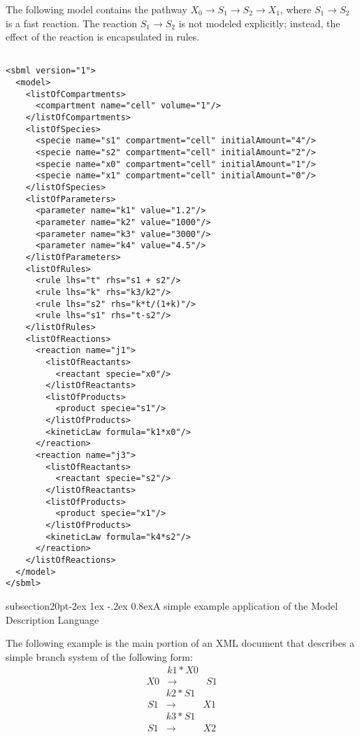 \documentclass[10pt]{article}
\makeatletter
\renewcommand{\subsection}{\@startsection%
  {subsection}{2}{0pt}{-2ex \@plus 1ex \@minus -.2ex}%
  {0.8ex}{\slshape\large\bfseries}}
\newcommand{\tightspacing}{\renewcommand{\baselinestretch}{0.85}}
\newcommand{\regularspacing}{\renewcommand{\baselinestretch}{1.0}}
\makeatother
\begin{document}
The following model contains the pathway $X_0 \rightarrow S_1
\rightarrow S_2 \rightarrow X_1$, where $S_1 \rightarrow S_2$ is
a fast reaction. The reaction $S_1 \rightarrow S_2$ is not
modeled explicitly; instead, the effect of the reaction is
encapsulated in rules.

\begin{small}
\tightspacing
\begin{verbatim}

<sbml version="1">
  <model>
    <listOfCompartments>
      <compartment name="cell" volume="1"/>
    </listOfCompartments>
    <listOfSpecies>
      <specie name="s1" compartment="cell" initialAmount="4"/>
      <specie name="s2" compartment="cell" initialAmount="2"/>
      <specie name="x0" compartment="cell" initialAmount="1"/>
      <specie name="x1" compartment="cell" initialAmount="0"/>
    </listOfSpecies>
    <listOfParameters>
      <parameter name="k1" value="1.2"/>
      <parameter name="k2" value="1000"/>
      <parameter name="k3" value="3000"/>
      <parameter name="k4" value="4.5"/>
    </listOfParameters>
    <listOfRules>
      <rule lhs="t" rhs="s1 + s2"/>
      <rule lhs="k" rhs="k3/k2"/>
      <rule lhs="s2" rhs="k*t/(1+k)"/>
      <rule lhs="s1" rhs="t-s2"/>
    </listOfRules>
    <listOfReactions>
      <reaction name="j1">
        <listOfReactants>
          <reactant specie="x0"/>
        </listOfReactants>
        <listOfProducts>
          <product specie="s1"/>
        </listOfProducts>
        <kineticLaw formula="k1*x0"/>
      </reaction>
      <reaction name="j3">
        <listOfReactants>
          <reactant specie="s2"/>
        </listOfReactants>
        <listOfProducts>
          <product specie="x1"/>
        </listOfProducts>
        <kineticLaw formula="k4*s2"/>
      </reaction>
    </listOfReactions>
  </model>
</sbml>

\end{verbatim}
  \regularspacing
\end{small}


\subsection{A simple example application of the Model Description Language}

The following example is the main portion of an XML document that
describes a simple branch system of the following form:
\[
\begin{array}{ccc}
& {k1 * X0}\\
X0 & \longrightarrow & S1
\end{array}
\]
\[
\begin{array}{ccc}
& {k2 * S1}\\
S1 & \longrightarrow & X1
\end{array}
\]
\[
\begin{array}{ccc}
& {k3 * S1}\\
S1 & \longrightarrow & X2
\end{array}
\]
\end{document}
